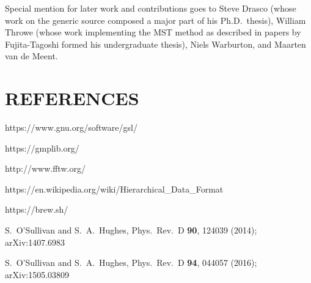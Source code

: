 \documentclass[11pt]{article}
\begin{document}
Special mention for later work and contributions goes to Steve Drasco (whose work on the generic source composed a major part of his Ph.D.\ thesis), William Throwe (whose work implementing the MST method as described in papers by Fujita-Tagoshi formed his undergraduate thesis), Niels Warburton, and Maarten van de Meent.

\clearpage

\section{REFERENCES}
\begin{thebibliography}{99}

 https://www.gnu.org/software/gsl/

 https://gmplib.org/

 http://www.fftw.org/

 https://en.wikipedia.org/wiki/Hierarchical\_Data\_Format

 https://brew.sh/

 S.\ O'Sullivan and S.\ A.\ Hughes, Phys.\ Rev.\ D {\bf 90}, 124039 (2014); arXiv:1407.6983

 S.\ O'Sullivan and S.\ A.\ Hughes, Phys.\ Rev.\ D {\bf 94}, 044057 (2016); arXiv:1505.03809

\end{thebibliography}
\end{document}
